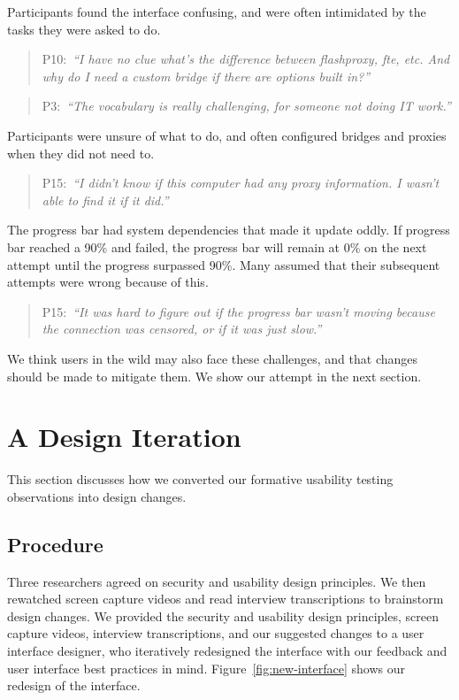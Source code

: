 \documentclass[USenglish,oneside,twocolumn]{article}
\newcommand{\pquote}[2]{
\begin{quotation}
\noindent #1:~\textit{#2}
\end{quotation}
}
\begin{document}
Participants found the interface confusing, and were often intimidated by the tasks they were asked to do. 

\pquote{P10}{``I have no clue what's the difference between flashproxy, fte, etc. And why do I need a custom bridge if there are options built in?''}

\pquote{P3}{``The vocabulary is really challenging, for someone not doing IT work.''}

Participants were unsure of what to do, and often configured bridges and proxies when they did not need to.  

\pquote{P15}{``I didn't know if this computer had any proxy information. I wasn't able to find it if it did.''}

The progress bar had system dependencies that made it update oddly. If progress bar reached a 90\% and failed, the progress bar will remain at 0\% on the next attempt until the progress surpassed 90\%. Many assumed that their subsequent attempts were wrong because of this.

\pquote{P15}{``It was hard to figure out if the progress bar wasn't moving because the connection was censored, or if it was just slow.''}

We think users in the wild may also face these challenges, and that changes should be made to mitigate them. We show our attempt in the next section. 

\section{A Design Iteration}
\label{sec:design} 
This section discusses how we converted our formative usability testing observations into design changes. 

\subsection{Procedure} 
Three researchers agreed on security and usability design principles. 
We then rewatched screen capture videos and read interview transcriptions to brainstorm design changes. We provided the security and usability design principles, screen capture videos, interview transcriptions, and our suggested changes to a user interface designer, who iteratively redesigned the interface with our feedback and user interface best practices in mind. Figure~\ref{fig:new-interface} shows our redesign of the interface. 
\end{document}
